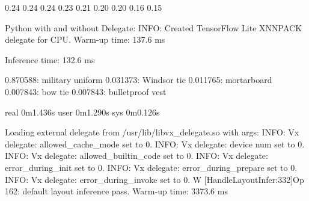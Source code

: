    0.24%
   0.24%
   0.24%
   0.23%
   0.21%
   0.20%
   0.20%
   0.16%
   0.15%
\endtt

Python with and without Delegate:
\begtt
INFO: Created TensorFlow Lite XNNPACK delegate for CPU.
Warm-up time: 137.6 ms

Inference time: 132.6 ms

0.870588: military uniform
0.031373: Windsor tie
0.011765: mortarboard
0.007843: bow tie
0.007843: bulletproof vest

real    0m1.436s
user    0m1.290s
sys     0m0.126s


Loading external delegate from /usr/lib/libvx_delegate.so with args: {}
INFO: Vx delegate: allowed_cache_mode set to 0.
INFO: Vx delegate: device num set to 0.
INFO: Vx delegate: allowed_builtin_code set to 0.
INFO: Vx delegate: error_during_init set to 0.
INFO: Vx delegate: error_during_prepare set to 0.
INFO: Vx delegate: error_during_invoke set to 0.
W [HandleLayoutInfer:332]Op 162: default layout inference pass.
Warm-up time: 3373.6 ms

